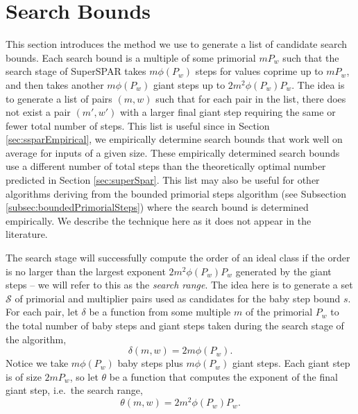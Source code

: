\documentclass{ucalgthes1}
\theoremstyle{definition}
\begin{document}
\section{Search Bounds}
\label{sec:ssparBabyStepBounds}

\newcommand{\stepCount}{\delta}
\newcommand{\lastStep}{\theta}
\newcommand{\stepBounds}{\mathcal S}

This section introduces the method we use to generate a list of candidate search bounds.  Each search bound is a multiple of some primorial $mP_w$ such that the search stage of SuperSPAR takes $m\phi(P_w)$ steps for values coprime up to $mP_w$, and then takes another $m\phi(P_w)$ giant steps up to $2m^2\phi(P_w)P_w$.  The idea is to generate a list of pairs $(m, w)$ such that for each pair in the list, there does not exist a pair $(m', w')$ with a larger final giant step requiring the same or fewer total number of steps.  This list is useful since in Section \ref{sec:ssparEmpirical}, we empirically determine search bounds that work well on average for inputs of a given size.  These empirically determined search bounds use a different number of total steps than the theoretically optimal number predicted in Section \ref{sec:superSpar}.  This list may also be useful for other algorithms deriving from the bounded primorial steps algorithm (see Subsection \ref{subsec:boundedPrimorialSteps}) where the search bound is determined empirically.  We describe the technique here as it does not appear in the literature.

The search stage will successfully compute the order of an ideal class if the order is no larger than the largest exponent $2m^2\phi(P_w)P_w$ generated by the giant steps -- we will refer to this as the \emph{search range}.  The idea here is to generate a set $\stepBounds$ of primorial and multiplier pairs used as candidates for the baby step bound $s$.  For each pair, let $\stepCount$ be a function from some multiple $m$ of the primorial $P_w$ to the total number of baby steps and giant steps taken during the search stage of the algorithm,
\begin{equation}
\label{eq:stepCount}
	\stepCount(m, w) = 2 m \phi(P_w).
\end{equation}
Notice we take $m \phi(P_w)$ baby steps plus $m \phi(P_w)$ giant steps.  Each giant step is of size $2mP_w$, so let $\lastStep$ be a function that computes the exponent of the final giant step, i.e.\ the search range,
\begin{equation}
\label{eq:lastStep}
	\lastStep(m, w) = 2 m^2 \phi(P_w) P_w.
\end{equation}
\end{document}

